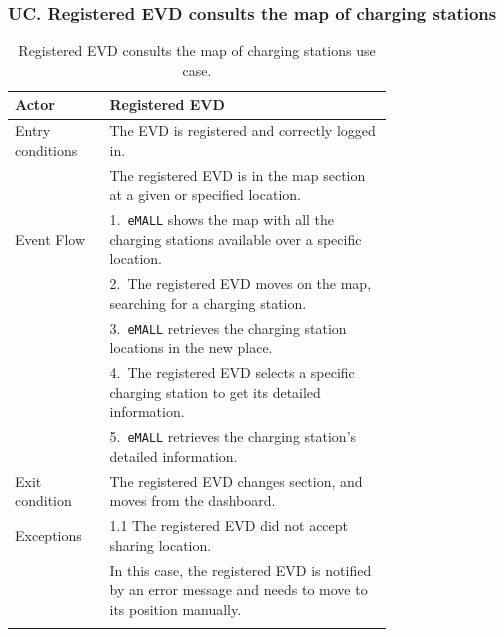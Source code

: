 \subsubsection*{UC\cuc . Registered EVD consults the map of charging stations}
\begin{center}
    \begin{longtable}{lp{0.75\linewidth}}
        \hline
        Actor            & Registered EVD                                                                                               \\
        \hline
        Entry conditions & The EVD is registered and correctly logged in.                                                               \\
        & The registered EVD is in the map section at a given or specified location.                                   \\
        \hline
        Event Flow       & 1.\ \verb|eMALL| shows the map with all the charging stations available over a specific location.                   \\
        & 2.\ The registered EVD moves on the map, searching for a charging station.                                   \\
        & 3.\ \verb|eMALL| retrieves the charging station locations in the new place.                                         \\
        & 4.\ The registered EVD selects a specific charging station to get its detailed information.                  \\
        & 5.\ \verb|eMALL| retrieves the charging station's detailed information.                                             \\
        \hline
        Exit condition   & The registered EVD changes section, and moves from the dashboard.                                            \\
        \hline
        Exceptions       & 1.1 The registered EVD did not accept sharing location.                                                      \\
        & In this case, the registered EVD is notified by an error message and needs to move to its position manually. \\
        \hline
        \caption{Registered EVD consults the map of charging stations use case.}
        \label{tab: EVD_map_charging_stations_use_case}
    \end{longtable}


\end{center}
